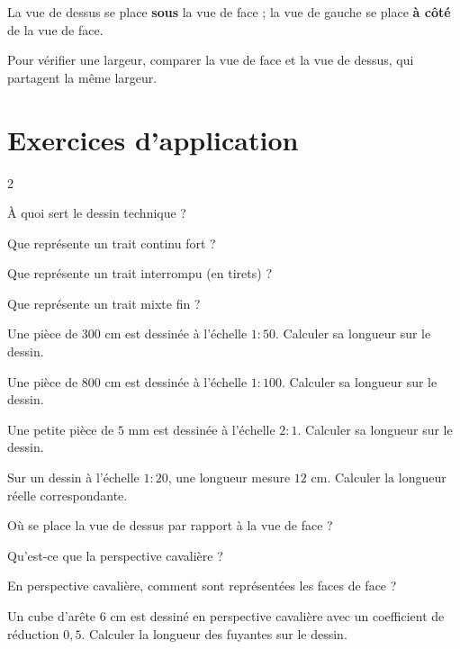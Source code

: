 La vue de dessus se place \textbf{sous} la vue de face ; la vue de gauche se place
\textbf{à côté} de la vue de face.
\begin{exemple}
Pour vérifier une largeur, comparer la vue de face et la vue de dessus, qui partagent la
même largeur.
\end{exemple}

\section{Exercices d'application}
\begin{multicols}{2}

\exo{} À quoi sert le dessin technique ?

\exo{} Que représente un trait continu fort ?

\exo{} Que représente un trait interrompu (en tirets) ?

\exo{} Que représente un trait mixte fin ?

\exo{} Une pièce de $300$ cm est dessinée à l'échelle $1{:}50$. Calculer sa
longueur sur le dessin.

\exo{} Une pièce de $800$ cm est dessinée à l'échelle $1{:}100$. Calculer sa
longueur sur le dessin.

\exo{} Une petite pièce de $5$ mm est dessinée à l'échelle $2{:}1$. Calculer sa
longueur sur le dessin.

\exo{} Sur un dessin à l'échelle $1{:}20$, une longueur mesure $12$ cm. Calculer
la longueur réelle correspondante.

\exo{} Où se place la vue de dessus par rapport à la vue de face ?

\exo{} Qu'est-ce que la perspective cavalière ?

\exo{} En perspective cavalière, comment sont représentées les faces de face ?

\exo{} Un cube d'arête $6$ cm est dessiné en perspective cavalière avec un
coefficient de réduction $0{,}5$. Calculer la longueur des fuyantes sur le dessin.

\end{multicols}

